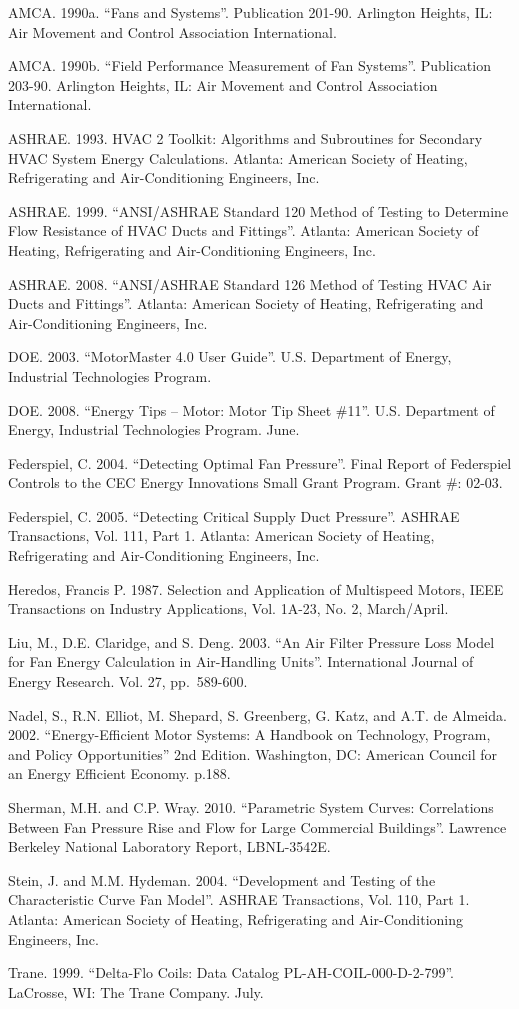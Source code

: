 AMCA. 1990a. ``Fans and Systems''. Publication 201-90. Arlington Heights, IL: Air Movement and Control Association International.

AMCA. 1990b. ``Field Performance Measurement of Fan Systems''. Publication 203-90. Arlington Heights, IL: Air Movement and Control Association International.

ASHRAE. 1993. HVAC 2 Toolkit: Algorithms and Subroutines for Secondary HVAC System Energy Calculations. Atlanta: American Society of Heating, Refrigerating and Air-Conditioning Engineers, Inc.

ASHRAE. 1999. ``ANSI/ASHRAE Standard 120 Method of Testing to Determine Flow Resistance of HVAC Ducts and Fittings''. Atlanta: American Society of Heating, Refrigerating and Air-Conditioning Engineers, Inc.

ASHRAE. 2008. ``ANSI/ASHRAE Standard 126 Method of Testing HVAC Air Ducts and Fittings''. Atlanta: American Society of Heating, Refrigerating and Air-Conditioning Engineers, Inc.

DOE. 2003. ``MotorMaster 4.0 User Guide''. U.S. Department of Energy, Industrial Technologies Program.

DOE. 2008. ``Energy Tips -- Motor: Motor Tip Sheet \#11''. U.S. Department of Energy, Industrial Technologies Program. June.

Federspiel, C. 2004. ``Detecting Optimal Fan Pressure''. Final Report of Federspiel Controls to the CEC Energy Innovations Small Grant Program. Grant \#: 02-03.

Federspiel, C. 2005. ``Detecting Critical Supply Duct Pressure''. ASHRAE Transactions, Vol. 111, Part 1. Atlanta: American Society of Heating, Refrigerating and Air-Conditioning Engineers, Inc.

Heredos, Francis P. 1987. Selection and Application of Multispeed Motors, IEEE Transactions on Industry Applications, Vol. 1A-23, No. 2, March/April.

Liu, M., D.E. Claridge, and S. Deng. 2003. ``An Air Filter Pressure Loss Model for Fan Energy Calculation in Air-Handling Units''. International Journal of Energy Research. Vol. 27, pp.~589-600.

Nadel, S., R.N. Elliot, M. Shepard, S. Greenberg, G. Katz, and A.T. de Almeida. 2002. ``Energy-Efficient Motor Systems: A Handbook on Technology, Program, and Policy Opportunities'' 2nd Edition. Washington, DC: American Council for an Energy Efficient Economy. p.188.

Sherman, M.H. and C.P. Wray. 2010. ``Parametric System Curves: Correlations Between Fan Pressure Rise and Flow for Large Commercial Buildings''. Lawrence Berkeley National Laboratory Report, LBNL-3542E.

Stein, J. and M.M. Hydeman. 2004. ``Development and Testing of the Characteristic Curve Fan Model''. ASHRAE Transactions, Vol. 110, Part 1. Atlanta: American Society of Heating, Refrigerating and Air-Conditioning Engineers, Inc.

Trane. 1999. ``Delta-Flo Coils: Data Catalog PL-AH-COIL-000-D-2-799''. LaCrosse, WI: The Trane Company. July.
